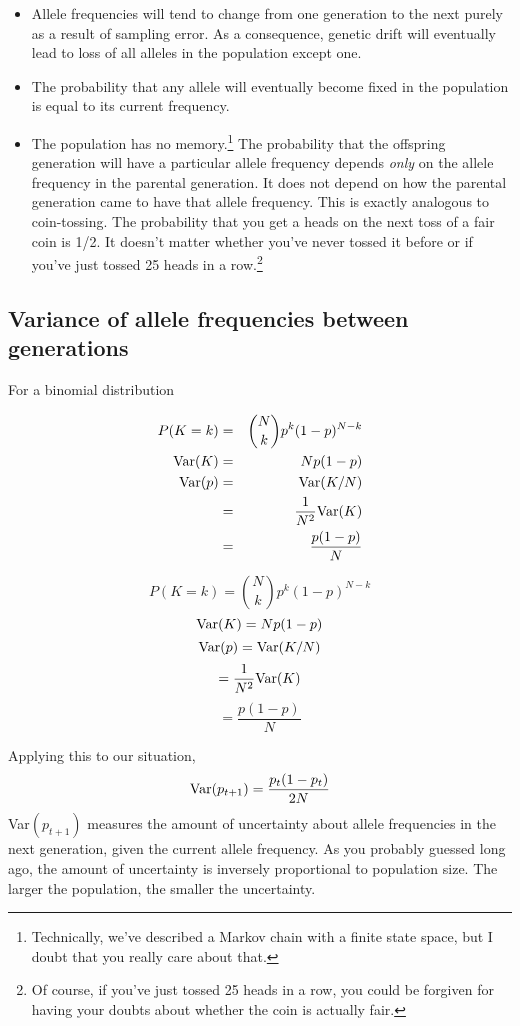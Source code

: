 \begin{itemize}

\item Allele frequencies will tend to change from one generation to
the next purely as a result of sampling error. As a consequence,
genetic drift will eventually lead to loss of all alleles in the
population except one.

\item The probability that any allele will eventually become fixed in
the population is equal to its current frequency.

\item The population has no memory.\footnote{Technically, we've
described a Markov chain with a finite state space, but I doubt that
you really care about that.} The probability that the offspring
generation will have a particular allele frequency depends {\it
only\/} on the allele frequency in the parental generation. It does
not depend on how the parental generation came to have that allele
frequency. This is exactly analogous to coin-tossing. The probability
that you get a heads on the next toss of a fair coin is 1/2. It
doesn't matter whether you've never tossed it before or if you've just
tossed 25 heads in a row.\footnote{Of course, if you've just tossed 25
heads in a row, you could be forgiven for having your doubts about
whether the coin is actually fair.}

\end{itemize}

\subsection*{Variance of allele frequencies between
  generations}

For a binomial distribution
\begin{latexonly}
\begin{eqnarray*}
P(K=k) &=& {{N \choose k}p^k(1-p)^{N-k}} \\
\hbox{Var}(K) &=& Np(1-p) \\
\hbox{Var}(p) &=& \hbox{Var}(K/N) \\
              &=& \frac{1}{N^2}\hbox{Var}(K) \\
              &=& \frac{p(1-p)}{N}
\end{eqnarray*}
\end{latexonly}
\begin{htmlonly}
\[
P(K=k) = {{N \choose k}p^k(1-p)^{N-k}}
\]
\[
\hbox{Var}(K) = Np(1-p)
\]
\[
\hbox{Var}(p) = \hbox{Var}(K/N)
\]
\[
              = \frac{1}{N^2}\hbox{Var}(K)
\]
\[
              = \frac{p(1-p)}{N}
\]
\end{htmlonly}
Applying this to our situation,
\[
\hbox{Var}(p_{t+1}) = \frac{p_t(1-p_t)}{2N}
\]
Var$(p_{t+1})$ measures the amount of uncertainty about allele
frequencies in the next generation, given the current allele
frequency. As you probably guessed long ago, the amount of uncertainty
is inversely proportional to population size. The larger the
population, the smaller the uncertainty.

